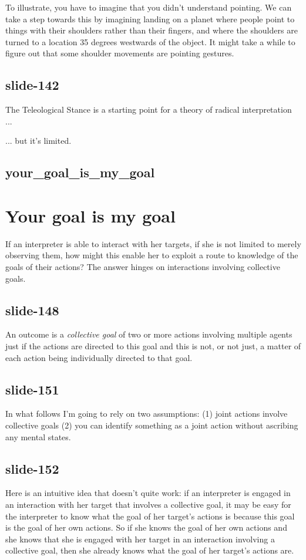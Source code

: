\documentclass[12pt,\papersize]{extarticle}
\begin{document}
To illustrate, you have to imagine that you didn’t understand pointing.
We can take a step towards this by imagining
landing on a planet where people point to things with their shoulders
rather than their fingers, and where the shoulders are turned to
a location 35 degrees westwards of the object.
It might take a while to figure out that some shoulder movements are pointing
gestures.

\subsection{slide-142}
The Teleological Stance is a starting point for a theory of radical interpretation ...

... but it’s limited.


\subsection{your\_goal\_is\_my\_goal}


\section{Your goal is my goal}

If an interpreter is able to interact with her targets,
if she is not limited to merely observing them,
how might this enable her to exploit a route to knowledge of the goals of their actions?
The answer hinges on interactions involving collective goals.

\subsection{slide-148}
An outcome is a \emph{collective goal} of two or more actions involving multiple agents
just if the actions are directed to this goal and this is not, or not just, a matter
of each action being individually directed to that goal.

\subsection{slide-151}
In what follows I’m going to rely on two assumptions:
(1) joint actions involve collective goals
(2) you can identify something as a joint action without ascribing any mental states.

\subsection{slide-152}
Here is an intuitive idea that doesn't quite work:
if an interpreter is engaged in an interaction with her target that involves a collective goal,
it may be easy for the interpreter to know what the goal of her target's actions is because this
goal is the goal of her own actions.
So if she knows the goal of her own actions and she knows that she is engaged with
her target in an interaction involving a collective goal,
then she already knows what the goal of her target's actions are.
\end{document}
